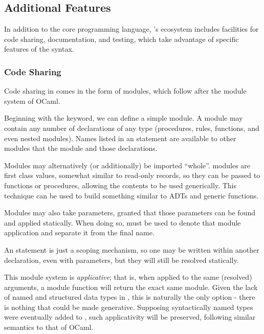 \subsection{Additional Features}

In addition to the core programming language, \Trilogy{}'s ecosystem includes
facilities for code sharing, documentation, and testing, which take advantage
of specific features of the syntax.

\subsubsection{Code Sharing}

Code sharing in \Trilogy{} comes in the form of modules, which follow after
the module system of OCaml.


Beginning with the  keyword, we can define a simple module. A
module may contain any number of declarations of any type (procedures,
rules, functions, and even nested modules). Names listed in an 
statement are available to other modules that  the module and
 those declarations.


Modules may alternatively (or additionally) be imported ``whole''. \Trilogy{}
modules are first class values, somewhat similar to read-only records, so they
can be passed to functions or procedures, allowing the contents to be used
generically. This technique can be used to build something similar to ADTs
and generic functions.


Modules may also take parameters, granted that those parameters can be found
and applied statically. When doing so,  must be used to denote that
module application and separate it from the final name.

An  statement is just a scoping mechanism, so one may be written
within another declaration, even with parameters, but they will still be
resolved statically.

This module system is \emph{applicative}; that is, when applied to the same
(resolved) arguments, a module function will return the exact same module.
Given the lack of named and structured data types in \Trilogy{}, this is
naturally the only option - there is nothing that could be made generative.
Supposing syntactically named types were eventually added to \Trilogy{},
such applicativity will be preserved, following similar semantics to that of
OCaml.

